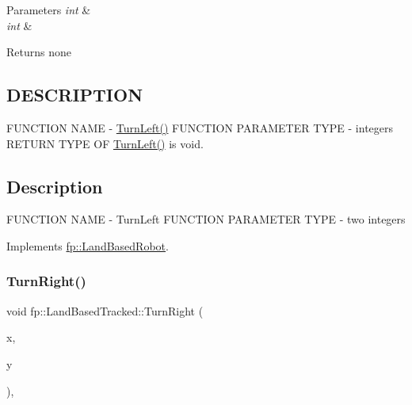 \begin{DoxyParams}{Parameters}
{\em int} & \\
\hline
{\em int} & \\
\hline
\end{DoxyParams}
\begin{DoxyReturn}{Returns}
none 
\end{DoxyReturn}
\hypertarget{_m_a_z_e_8h_DESCRIPTION}{}\subsection{D\+E\+S\+C\+R\+I\+P\+T\+I\+ON}\label{_m_a_z_e_8h_DESCRIPTION}
F\+U\+N\+C\+T\+I\+ON N\+A\+ME -\/ \hyperlink{classfp_1_1_land_based_tracked_aab40e1a48e5142491f02b2936c4cacc3}{Turn\+Left()} F\+U\+N\+C\+T\+I\+ON P\+A\+R\+A\+M\+E\+T\+ER T\+Y\+PE -\/ integers R\+E\+T\+U\+RN T\+Y\+PE OF \hyperlink{classfp_1_1_land_based_tracked_aab40e1a48e5142491f02b2936c4cacc3}{Turn\+Left()} is void.\hypertarget{main_8cpp_Description}{}\subsection{Description}\label{main_8cpp_Description}
F\+U\+N\+C\+T\+I\+ON N\+A\+ME -\/ Turn\+Left F\+U\+N\+C\+T\+I\+ON P\+A\+R\+A\+M\+E\+T\+ER T\+Y\+PE -\/ two integers 

Implements \hyperlink{classfp_1_1_land_based_robot_a359e1012e9093475b7a1b0d38e41a118}{fp\+::\+Land\+Based\+Robot}.

\mbox{\label{classfp_1_1_land_based_tracked_a619c29950f6c484d3481e31ff01dad3a}} 
\subsubsection{\texorpdfstring{Turn\+Right()}{TurnRight()}}
{\footnotesize\ttfamily void fp\+::\+Land\+Based\+Tracked\+::\+Turn\+Right (\begin{DoxyParamCaption}\item[{int}]{x,  }\item[{int}]{y }\end{DoxyParamCaption})\hspace{0.3cm}{\ttfamily [override]}, {\ttfamily [virtual]}}



